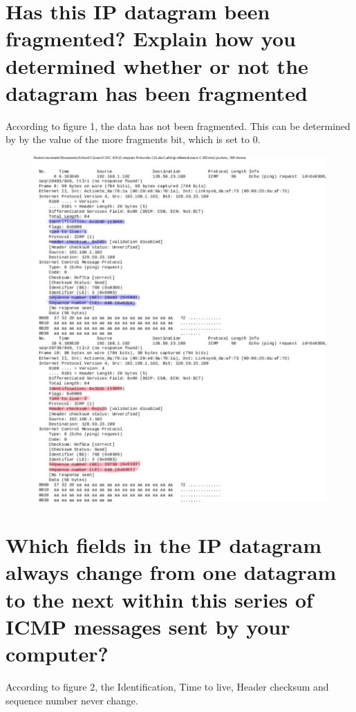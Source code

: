\documentclass{article}
\begin{document}
\section*{Has this IP datagram been fragmented? Explain how you determined whether or
not the datagram has been fragmented}
According to figure 1, the data has not been fragmented.  This can be determined by by the value of the more fragments bit, which is set to 0.\\

\begin{figure}[h!]
\centering
\includegraphics[scale=0.5]{Q5.pdf}
\caption{}
\end{figure}

\section*{Which fields in the IP datagram always change from one datagram to the next
within this series of ICMP messages sent by your computer?}
According to figure 2, the Identification, Time to live, Header checksum and sequence number never change.\\
\clearpage
\end{document}
